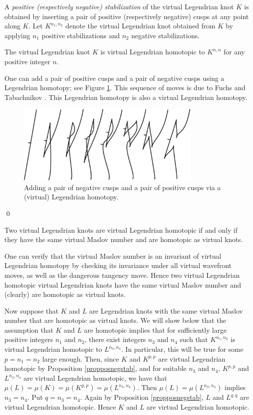 A {\it positive (respectively negative) stabilization} of the virtual Legendrian knot $K$ is obtained by inserting a pair of positive (respectively negative) cusps at any point along $K$.  Let $K^{n_1,n_2}$ denote the virtual Legendrian knot obtained from $K$ by applying $n_1$ positive stabilizations and $n_2$ negative stabilizations.  

\begin{prop}\label{propposnegstab} The virtual Legendrian knot $K$ is virtual Legendrian homotopic to $K^{n,n}$ for any positive integer $n$.
\end{prop}
\pp One can add a pair of positive cusps and a pair of negative cusps using a Legendrian homotopy; see Figure \ref{homotopyposnegstabilization}.  This sequence of moves is due to Fuchs and Tabachnikov \cite{f&t}.  This Legendrian homotopy is also a virtual Legendrian homotopy.
\begin{figure}[htbp]\label{homotopyposnegstabilization}\includegraphics[width=9cm]{homotopyposnegstabilization}
	\caption{Adding a pair of negative cusps and a pair of positive cusps via a (virtual) Legendrian homotopy.}
\end{figure}
\qed

\begin{thm} Two virtual Legendrian knots are virtual Legendrian homotopic if and only if they have the same virtual Maslov number and are homotopic as virtual knots.
\end{thm}
\pp One can verify that the virtual Maslov number is an invariant of virtual Legendrian homotopy by checking its invariance under all virtual wavefront moves, as well as the dangerous tangency move.  Hence two virtual Legendrian homotopic virtual Legendrian knots have the same virtual Maslov number and (clearly) are homotopic as virtual knots.

Now suppose that $K$ and $L$ are Legendrian knots with the same virtual Maslov number that are homotopic as virtual knots.  We will show below that the assumption that $K$ and $L$ are homotopic implies that for sufficiently large positive integers $n_1$ and $n_2$, there exist integers $n_3$ and $n_4$ such that $K^{n_1, n_2}$ is virtual Legendrian homotopic to $L^{n_3,n_4}$.  In particular, this will be true for some $p=n_1=n_2$ large enough.  Then, since $K$ and $K^{p,p}$ are virtual Legendrian homotopic by Proposition \ref{propposnegstab}, and for suitable $n_3$ and $n_4$, $K^{p,p}$ and $L^{n_3,n_4}$ are virtual Legendrian homotopic, we have that $\mu(L)=\mu(K)=\mu(K^{p,p})=\mu(L^{n_3,n_4})$.  Then $\mu(L)=\mu(L^{n_3,n_4})$ implies $n_3=n_4$.  Put $q=n_3=n_4$.  Again by Proposition \ref{propposnegstab}, $L$ and $L^{q,q}$ are virtual Legendrian homotopic. Hence $K$ and $L$ are virtual Legendrian homotopic.

